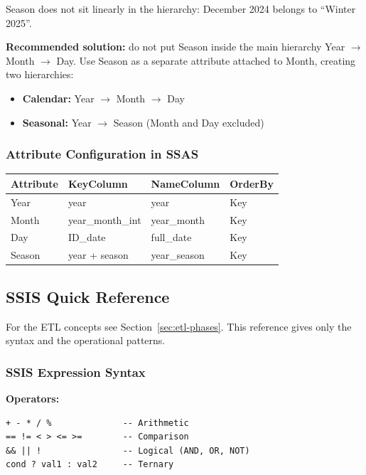 Season does not sit linearly in the hierarchy: December 2024 belongs to ``Winter 2025''.

\textbf{Recommended solution:} do not put Season inside the main hierarchy Year $\to$ Month $\to$ Day. Use Season as a separate attribute attached to Month, creating two hierarchies:
\begin{itemize}
    \item \textbf{Calendar:} Year $\to$ Month $\to$ Day
    \item \textbf{Seasonal:} Year $\to$ Season (Month and Day excluded)
\end{itemize}

\subsubsection{Attribute Configuration in SSAS}
\label{subsec:ssas-date-config}

\begin{center}
\small
\begin{tabular}{@{}llll@{}}
\toprule
\textbf{Attribute} & \textbf{KeyColumn} & \textbf{NameColumn} & \textbf{OrderBy} \\
\midrule
Year & year & year & Key \\
Month & year\_month\_int & year\_month & Key \\
Day & ID\_date & full\_date & Key \\
Season & year + season & year\_season & Key \\
\bottomrule
\end{tabular}
\end{center}

\subsection{SSIS Quick Reference}
\label{sec:ssis-reference}

For the ETL concepts see Section~\ref{sec:etl-phases}. This reference gives only the syntax and the operational patterns.

\subsubsection{SSIS Expression Syntax}
\label{subsec:ssis-expression-syntax}

\textbf{Operators:}
\begin{lstlisting}
+ - * / %              -- Arithmetic
== != < > <= >=        -- Comparison
&& || !                -- Logical (AND, OR, NOT)
cond ? val1 : val2     -- Ternary
\end{lstlisting}

